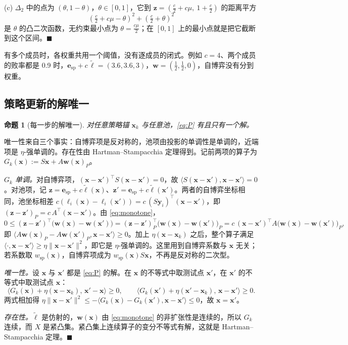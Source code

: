 \documentclass{article}
\theoremstyle{plain}
\newtheorem{proposition}[theorem]{命题}
\theoremstyle{remark}
\newcommand{\simplex}{\Delta}
\newcommand{\bx}{{\bm{x}}}
\newcommand{\by}{{\bm{y}}}
\newcommand{\bw}{{\bm{w}}}
\newcommand{\bz}{{\bm{z}}}
\newcommand{\be}{{\bm{e}}}
\newcommand{\bell}{{\bm{\ell}}}
\newcommand{\aug}{\tilde{\bell}}
\newcommand{\esp}{\be_{\mathrm{sp}}}
\newcommand{\wsp}{w_{\mathrm{sp}}}
\begin{document}
(c) $\simplex_2$ 中的点为 $(\theta,1-\theta)$，$\theta\in[0,1]$，它到 $\bz=(\tfrac c2+c\mu,\ 1+\tfrac c2)$ 的距离平方
\[
(\tfrac c2+c\mu-\theta)^2+(\tfrac c2+\theta)^2
\]
是 $\theta$ 的凸二次函数，无约束最小点为 $\theta=\tfrac{c\mu}2$；在 $[0,1]$ 上的最小点就是把它截断到这个区间。\hfill$\blacksquare$

有多个成员时，各权重共用一个阈值，没有逐成员的闭式。例如 $c=4$、两个成员的败率都是 0.9 时，$\esp+c\,\aug=(3.6,3.6,3)$，$\bw=(\tfrac12,\tfrac12,0)$，自博弈没有分到权重。

\subsection{策略更新的解唯一}
\label{app:unique}

\begin{proposition}[每一步的解唯一]
\label{prop:unique}
对任意策略锚 $\bx_k$ 与任意池，\eqref{eq:P} 有且只有一个解。
\end{proposition}
唯一性来自三个事实：自博弈项是反对称的，池项由投影的单调性是单调的，近端项是 $\eta$-强单调的。存在性由 Hartman--Stampacchia 定理得到。记前两项的算子为 $G_k(\bx):=S\bx+A\bw(\bx)_P$。

\textit{$G_k$ 单调。}对自博弈项，$(\bx-\bx')^\top S(\bx-\bx')=0$，故 $\langle S(\bx-\bx'),\bx-\bx'\rangle=0$。对池项，记 $\bz=\esp+c\aug(\bx)$、$\bz'=\esp+c\aug(\bx')$。两者的自博弈坐标相同，池坐标相差 $c(\ell_i(\bx)-\ell_i(\bx'))=c\,(S\by_i)^\top(\bx-\bx')$，即 $(\bz-\bz')_P=c\,A^\top(\bx-\bx')$。由 \eqref{eq:monotone}，
\[
0\le(\bz-\bz')^\top\big(\bw(\bx)-\bw(\bx')\big)=(\bz-\bz')_P^\top\big(\bw(\bx)-\bw(\bx')\big)_P=c\,(\bx-\bx')^\top A\big(\bw(\bx)-\bw(\bx')\big)_P ,
\]
即 $\langle A\bw(\bx)_P-A\bw(\bx')_P,\bx-\bx'\rangle\ge0$。加上 $\eta(\bx-\bx_k)$ 之后，整个算子满足 $\langle\cdot,\bx-\bx'\rangle\ge\eta\|\bx-\bx'\|^2$，即它是 $\eta$-强单调的。这里用到自博弈系数与 $\bx$ 无关；若系数取 $\wsp(\bx)$，自博弈项成为 $\wsp(\bx)S\bx$，不再是反对称的二次型。

\textit{唯一性。}设 $\bx$ 与 $\bx'$ 都是 \eqref{eq:P} 的解。在 $\bx$ 的不等式中取测试点 $\bx'$，在 $\bx'$ 的不等式中取测试点 $\bx$：
\[
\langle G_k(\bx)+\eta(\bx-\bx_k),\,\bx'-\bx\rangle\ge0,\qquad\langle G_k(\bx')+\eta(\bx'-\bx_k),\,\bx-\bx'\rangle\ge0 .
\]
两式相加得 $\eta\|\bx-\bx'\|^2\le-\langle G_k(\bx)-G_k(\bx'),\bx-\bx'\rangle\le0$，故 $\bx=\bx'$。

\textit{存在性。}$\aug$ 是仿射的，$\bw(\bx)$ 由 \eqref{eq:monotone} 的非扩张性是连续的，所以 $G_k$ 连续，而 $X$ 是紧凸集。紧凸集上连续算子的变分不等式有解，这就是 Hartman--Stampacchia 定理\citep{hartman1966,facchinei2003vi}。\hfill$\blacksquare$
\end{document}
